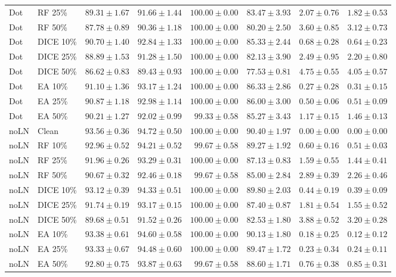 {\begin{longtable}{llrrrrrr}
Dot & RF 25\% & $89.31\pm1.67$ & $91.66\pm1.44$ & $100.00\pm0.00$ & $83.47\pm3.93$ & $2.07\pm0.76$ & $1.82\pm0.53$ \\
Dot & RF 50\% & $87.78\pm0.89$ & $90.36\pm1.18$ & $100.00\pm0.00$ & $80.20\pm2.50$ & $3.60\pm0.85$ & $3.12\pm0.73$ \\
Dot & DICE 10\% & $90.70\pm1.40$ & $92.84\pm1.33$ & $100.00\pm0.00$ & $85.33\pm2.44$ & $0.68\pm0.28$ & $0.64\pm0.23$ \\
Dot & DICE 25\% & $88.89\pm1.53$ & $91.28\pm1.50$ & $100.00\pm0.00$ & $82.13\pm3.90$ & $2.49\pm0.95$ & $2.20\pm0.80$ \\
Dot & DICE 50\% & $86.62\pm0.83$ & $89.43\pm0.93$ & $100.00\pm0.00$ & $77.53\pm0.81$ & $4.75\pm0.55$ & $4.05\pm0.57$ \\
Dot & EA 10\% & $91.10\pm1.36$ & $93.17\pm1.24$ & $100.00\pm0.00$ & $86.33\pm2.86$ & $0.27\pm0.28$ & $0.31\pm0.15$ \\
Dot & EA 25\% & $90.87\pm1.18$ & $92.98\pm1.14$ & $100.00\pm0.00$ & $86.00\pm3.00$ & $0.50\pm0.06$ & $0.51\pm0.09$ \\
Dot & EA 50\% & $90.21\pm1.27$ & $92.02\pm0.99$ & $99.33\pm0.58$ & $85.27\pm3.43$ & $1.17\pm0.15$ & $1.46\pm0.13$ \\
noLN & Clean & $93.56\pm0.36$ & $94.72\pm0.50$ & $100.00\pm0.00$ & $90.40\pm1.97$ & $0.00\pm0.00$ & $0.00\pm0.00$ \\
noLN & RF 10\% & $92.96\pm0.52$ & $94.21\pm0.52$ & $99.67\pm0.58$ & $89.27\pm1.92$ & $0.60\pm0.16$ & $0.51\pm0.03$ \\
noLN & RF 25\% & $91.96\pm0.26$ & $93.29\pm0.31$ & $100.00\pm0.00$ & $87.13\pm0.83$ & $1.59\pm0.55$ & $1.44\pm0.41$ \\
noLN & RF 50\% & $90.67\pm0.32$ & $92.46\pm0.18$ & $99.67\pm0.58$ & $85.00\pm2.84$ & $2.89\pm0.39$ & $2.26\pm0.46$ \\
noLN & DICE 10\% & $93.12\pm0.39$ & $94.33\pm0.51$ & $100.00\pm0.00$ & $89.80\pm2.03$ & $0.44\pm0.19$ & $0.39\pm0.09$ \\
noLN & DICE 25\% & $91.74\pm0.19$ & $93.17\pm0.15$ & $100.00\pm0.00$ & $87.40\pm0.87$ & $1.81\pm0.54$ & $1.55\pm0.52$ \\
noLN & DICE 50\% & $89.68\pm0.51$ & $91.52\pm0.26$ & $100.00\pm0.00$ & $82.53\pm1.80$ & $3.88\pm0.52$ & $3.20\pm0.28$ \\
noLN & EA 10\% & $93.38\pm0.61$ & $94.60\pm0.58$ & $100.00\pm0.00$ & $90.13\pm1.80$ & $0.18\pm0.25$ & $0.12\pm0.12$ \\
noLN & EA 25\% & $93.33\pm0.67$ & $94.48\pm0.60$ & $100.00\pm0.00$ & $89.47\pm1.72$ & $0.23\pm0.34$ & $0.24\pm0.11$ \\
noLN & EA 50\% & $92.80\pm0.75$ & $93.87\pm0.63$ & $99.67\pm0.58$ & $88.60\pm1.71$ & $0.76\pm0.38$ & $0.85\pm0.31$ \\
\end{longtable}
}

